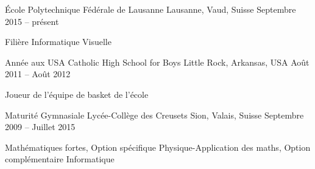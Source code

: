 

\begin{cventries}

	{École Polytechnique Fédérale de Lausanne}
	{Lausanne, Vaud, Suisse}
	{Septembre 2015 -- présent}{
		\begin{cvitems}
			\item{Filière Informatique Visuelle}
		\end{cvitems}
	}
	
	\cventry
	{Année aux USA}
	{Catholic High School for Boys}
	{Little Rock, Arkansas, USA}
	{Août 2011 -- Août 2012}
	{\begin{cvitems}
			\item{Joueur de l'équipe de basket de l'école}
		\end{cvitems}
	}
	
	\cventry
	{Maturité Gymnasiale}
	{Lycée-Collège des Creusets}
	{Sion, Valais, Suisse}
	{Septembre 2009 -- Juillet 2015}
	{
		\begin{cvitems}
			\item{Mathématiques fortes, Option spécifique Physique-Application des maths, Option complémentaire Informatique}
		\end{cvitems}
	}

	

	



\end{cventries}
